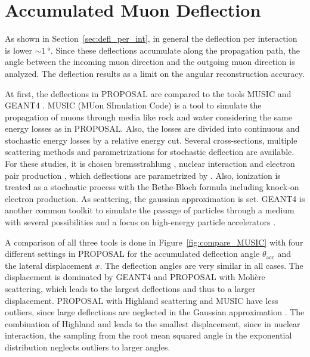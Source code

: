 \section{Accumulated Muon Deflection}\label{sec:accum_defl}

As shown in Section~\ref{sec:defl_per_int}, in general the deflection per interaction 
is lower $\sim\SI{1}{\degree}$. Since these deflections accumulate along the 
propagation path, the angle between the incoming muon direction and the outgoing 
muon direction is analyzed. The deflection results as a limit on the 
angular reconstruction accuracy.

At first, the deflections in PROPOSAL are compared to 
the tools MUSIC \cite{MUSIC,comparison_MUSIC_GEANT4_2009} and GEANT4 \cite{GEANT4}.
MUSIC (MUon SImulation Code) is a tool to simulate the propagation of muons 
through media like rock and water considering the same energy losses as in 
PROPOSAL. Also, the losses are divided into continuous and stochastic 
energy losses by a relative energy cut. Several cross-sections, multiple scattering 
methods and parametrizations for stochastic deflection are 
available. For these studies, it is chosen bremsstrahlung \cite{Bremsstrahlung_KKP}, 
nuclear interaction \cite{nulcint_bugaev_Shlepin, bugaev_1980_defl,bugaev_1981_defl} 
and electron pair production \cite{epair_kelner,epair_kokoulin_petrukhin}, 
which deflections are parametrized by \cite{Van_Ginneken}. 
Also, ionization is treated as a stochastic process with the Bethe-Bloch 
formula including knock-on electron production. As scattering, the gaussian 
approximation \cite{HIGHLAND_1975} is set. 
GEANT4 is another common toolkit to simulate the passage of particles through 
a medium with several possibilities and a focus on high-energy 
particle accelerators \cite{GEANT4}. 

A comparison of all three tools is done in Figure~\ref{fig:compare_MUSIC} 
with four different settings in PROPOSAL for the 
accumulated deflection angle $\theta_{\text{acc}}$ and the lateral displacement
$x$. The deflection angles are very similar in all cases. The 
displacement is dominated by GEANT4 and PROPOSAL with Molière scattering, which 
leads to the largest deflections and thus to a larger displacement. 
PROPOSAL with Highland scattering and MUSIC have less outliers, since large 
deflections are neglected in the Gaussian approximation \cite{HIGHLAND_1975}. 
The combination of Highland and \cite{Van_Ginneken} leads to the smallest 
displacement, since in nuclear interaction, the sampling from the root mean squared angle in the 
exponential distribution neglects outliers to larger angles.


